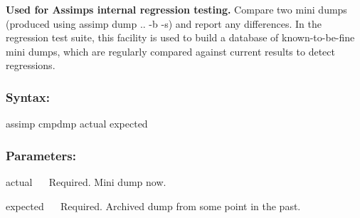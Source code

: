 {\bfseries Used for Assimp\textquotesingle{}s internal regression testing.} Compare two mini dumps (produced using {\ttfamily assimp dump .. -\/b -\/s}) and report any differences. In the regression test suite, this facility is used to build a database of \textquotesingle{}known-\/to-\/be-\/fine\textquotesingle{} mini dumps, which are regularly compared against current results to detect regressions.

\subsubsection*{Syntax\+:}


\begin{DoxyCode}
assimp cmpdmp actual expected
\end{DoxyCode}


\subsubsection*{Parameters\+:}

{\ttfamily  actual~\newline
}~\newline
 Required. Mini dump now. 

{\ttfamily  expected~\newline
}~\newline
 Required. Archived dump from some point in the past. 